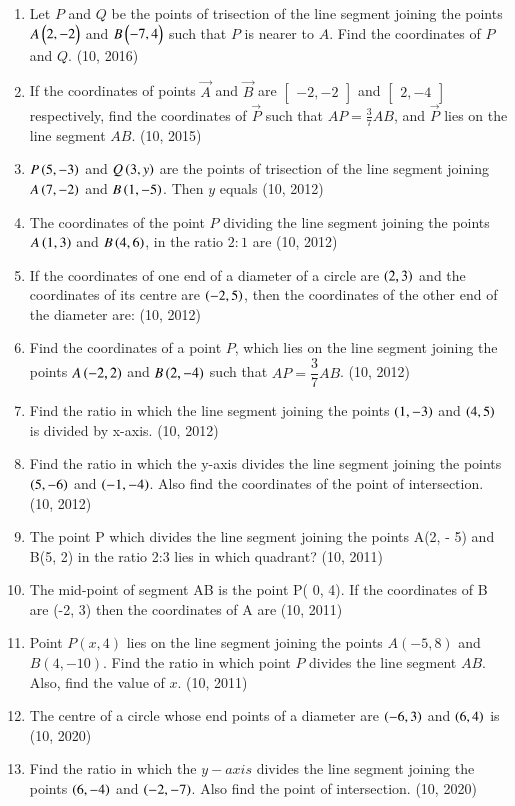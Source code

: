 \begin{enumerate}[label=\thesubsection.\arabic*,ref=\thesubsection.\theenumi]
    \item Let $P$ and $Q$ be the points of trisection of the line segment joining the points $A \begin{pmatrix}2,-2\end{pmatrix}$ and $B \begin{pmatrix}-7, 4\end{pmatrix}$ such that $P$ is nearer to $A$. Find the coordinates of $P$ and $Q$. \hfill (10, 2016)
\item If the coordinates of points $\vec{A}$ and $\vec{B}$ are $\begin{bmatrix}-2, -2\end{bmatrix}$ and $\begin{bmatrix}2, -4\end{bmatrix}$ respectively, find the coordinates of $\vec{P}$ such that $AP = \frac{3}{7} AB$, and $\vec{P}$ lies on the line segment $AB$. \hfill (10, 2015)
\item  $P\left(5,-3\right)$ and $Q\left(3,y\right)$ are the points of trisection of the line segment joining $A\left(7,-2\right)$ and $B\left(1,-5\right)$. Then $y$ equals
\hfill (10, 2012)
\item The coordinates of the point $P$ dividing the line segment joining the points $A\left(1,3\right)$ and $B\left(4,6\right)$, in the ratio $2:1$ are
\hfill (10, 2012)
\item If the coordinates of one end of a diameter of a circle are $\left(2,3\right)$ and the coordinates of its centre are $\left(-2,5\right)$, then the coordinates of the other end of the diameter are:
\hfill (10, 2012)
\item Find the coordinates of a point $P$, which lies on the line segment joining the points $A\left(-2,2\right)$ and $B\left(2,-4\right)$ such that $AP = \dfrac{3}{7} AB$. 
\hfill (10, 2012)
\item Find the ratio in which the line segment joining the points $\left(1,-3\right)$ and $\left(4,5\right)$ is divided by x-axis. 
\hfill (10, 2012)
\item Find the ratio in which the y-axis divides the line segment joining the points $\left(5,-6\right)$ and $\left(-1,-4\right)$. Also find the coordinates of the point of intersection. 
\hfill (10, 2012)
    \item The point P which divides the line segment joining the points A(2, - 5) and B(5, 2) in the ratio 2:3 lies in which quadrant?
\hfill (10, 2011)
    \item The mid-point of segment AB is the point P( 0, 4). If the coordinates of B are (-2, 3) then the coordinates of A are
\hfill (10, 2011)
\item Point $P(x, 4)$ lies on the line segment joining the points $A (-5,8)$ and $B (4, -10)$. Find the ratio in which point $P$ divides the line segment $AB$. Also, find the value of $x$.
\hfill (10, 2011)
\item The centre of a circle whose end points of a diameter are $\left(-6,3\right)$ and $\left(6,4\right)$ is
\hfill (10, 2020)
\item Find the ratio in which the $y-axis$ divides the line segment joining the points $\left(6,-4\right)$ and $\left(-2, -7\right)$. Also find the point of intersection.
\hfill (10, 2020)
\end{enumerate}
